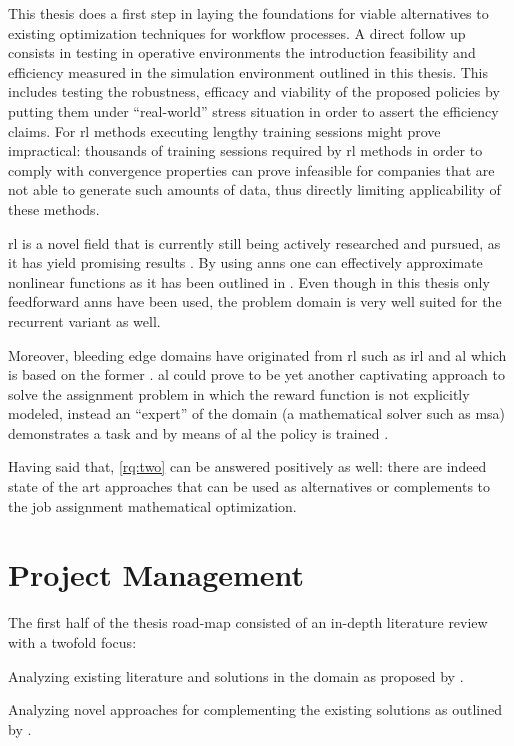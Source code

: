 \documentclass[draft=false]{seal_thesis}
\begin{document}
This thesis does a first step in laying the foundations for viable alternatives to existing optimization techniques for workflow processes. A direct follow up consists in testing in operative environments the introduction feasibility and efficiency measured in the simulation environment outlined in this thesis. This includes testing the robustness, efficacy and viability of the proposed policies by putting them under ``real-world'' stress situation in order to assert the efficiency claims. For \gls{rl} methods executing lengthy training sessions might prove impractical: thousands of training sessions required by \gls{rl} methods in order to comply with convergence properties can prove infeasible for companies that are not able to generate such amounts of data, thus directly limiting applicability of these methods.

\gls{rl} is a novel field that is currently still being actively researched and pursued, as it has yield promising results \citep{Mnih2015,Silver2016}. By using \glspl{ann} one can effectively approximate nonlinear functions as it has been outlined in . Even though in this thesis only feedforward \glspl{ann} have been used, the problem domain is very well suited for the recurrent variant as well.

Moreover, bleeding edge domains have originated from \gls{rl} such as \gls{irl} \citep{Ng2000} and \gls{al} which is based on the former \citep{Abbeel2004}. \gls{al} could prove to be yet another captivating approach to solve the assignment problem in which the reward function is not explicitly modeled, instead an ``expert'' of the domain (\ie a mathematical solver such as \gls{msa}) demonstrates a task and by means of \gls{al} the policy is trained \citep{Abbeel2004}.

Having said that, \ref{rq:two} can be answered positively as well: there are indeed state of the art approaches that can be used as alternatives or complements to the job assignment mathematical optimization. 

\appendix

\glsresetall

\chapter{Project Management}
\label{ch:project_management}

The first half of the thesis road-map consisted of an in-depth literature review with a twofold focus:
\begin{enumerate*}
	\item Analyzing existing literature and solutions in the domain as proposed by \citet{Zeng2005}.
	\item Analyzing novel approaches for complementing the existing solutions as outlined by \citet{Sutton2017}.
\end{enumerate*}
\end{document}
